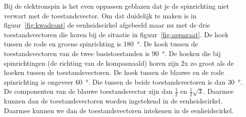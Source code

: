 \documentclass[../main.tex]{subfiles}
\begin{document}
Bij de elektronspin is het even oppassen geblazen dat je de spinrichting niet verwart met de toestandsvector. Om dat duidelijk te maken is in figuur~\ref{fig:kwadrant} de eenheidscirkel afgebeeld maar nu met de drie toestandsvectoren die horen bij de situatie in figuur~\ref{fig:apparaat}. De hoek tussen de rode en groene spinrichting is \SI{180}{\degree}. De hoek tussen de toestandsvectoren van de twee basistoestanden is \SI{90}{\degree}.  De hoeken die bij spinrichtingen (de richting van de kompasnaald) horen zijn 2x zo groot als de hoeken tussen de toestandsvectoren. De hoek tussen de blauwe en de rode spinrichting is ongeveer \SI{60}{\degree}. Die tussen de beide toestandsvectoren is dan \SI{30}{\degree}. De componenten van de blauwe toestandsvector zijn dan $\tfrac{1}{2}$ en $\tfrac{1}{2}\sqrt{3}$. Daarmee kunnen dan de toestandsvectoren worden ingetekend in de eenheidscirkel. Daarmee kunnen we dan de toestandsvectoren intekenen in de eenheidscirkel.

\begin{flushleft}
\begin{minipage}{.45\textwidth}
\def\ojfrangle{0}
\def\ojobangle{60}
\def\ojscale{.75}
\end{minipage}%
\hfill
\begin{minipage}{.5\textwidth}
\end{minipage}
\end{flushleft}
\end{document}
